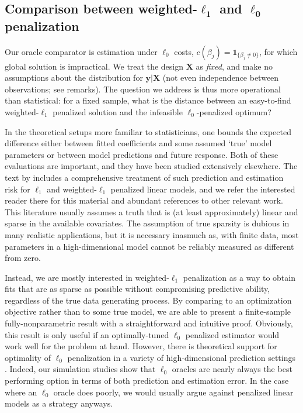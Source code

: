 \documentclass[12pt]{article}
\newcommand{\bs}[1]{\boldsymbol{#1}}
\newcommand{\bm}[1]{\mathbf{#1}}
\newcommand{\ds}[1]{\mathds{#1}}
\begin{document}
\subsection{Comparison between weighted-$\bs{\ell_1}$ and $\bs{\ell_0}$ penalization}


Our oracle comparator is estimation under $\ell_0$ costs, $c(\beta_j) =
\ds{1}_{\{\beta_j\neq0\}}$, for which global solution is impractical.  We
treat the design $\bm{X}$ as {\it fixed}, and make no assumptions
about the distribution for $\bm{y} | \bm{X}$ (not even independence between
observations; see remarks).   The question we address is thus more
operational than statistical: for a fixed sample, what is the distance between
an easy-to-find weighted-$\ell_1$ penalized solution and the infeasible
$\ell_0$-penalized optimum?

In the theoretical setups more familiar to statisticians,
one bounds the expected difference  either between fitted coefficients
and some assumed `true' model parameters or  between model predictions and future
response.  Both of these evaluations are important, and they have been studied
extensively elsewhere. The text by \cite{buhlmann_statistics_2011}
includes a comprehensive treatment of such prediction and estimation risk for
$\ell_1$ and weighted-$\ell_1$ penalized linear models,  and we refer the
interested reader there for this material and abundant references to other
relevant work.  This literature usually assumes a truth that is (at least
approximately) linear and sparse in the available covariates.  The assumption
of true sparsity is dubious in many realistic applications, but it is
necessary inasmuch as, with finite data, most parameters in a
high-dimensional model cannot be reliably measured as different from zero.

Instead, we are mostly
interested in weighted-$\ell_1$ penalization as a way to obtain fits that are
as sparse as possible without compromising predictive ability, regardless of the true data generating process.  By comparing
to an optimization objective rather than to some true model, we are able to
present a finite-sample fully-nonparametric result with a straightforward and intuitive proof. Obviously, this result is only useful if an optimally-tuned $\ell_0$
penalized estimator would work well for the problem at hand. However,  there
is theoretical support for optimality of $\ell_0$ penalization in a
 variety of high-dimensional prediction settings
\citep[e.g,][]{mallows_comments_1973,efron_estimation_2004}.  Indeed, our
simulation studies show that $\ell_0$ oracles are nearly always the
best performing option in terms of both prediction and estimation error.  In
the case where an $\ell_0$ oracle does poorly, we would usually argue against
penalized linear models as a strategy anyways.
\end{document}

